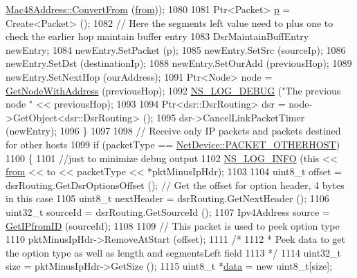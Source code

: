 \begin{DoxyCode}
      \hyperlink{classns3_1_1Mac48Address_a911ce13603a9ef837545a032b6523ae4}{Mac48Address::ConvertFrom} (\hyperlink{lte__amc_8m_a1b4c81ff74eb1a626b5ade44c81004b3}{from}));
1080 
1081       Ptr<Packet> \hyperlink{lte__link__budget_8m_ac9de518908a968428863f829398a4e62}{p} = Create<Packet> ();
1082       \textcolor{comment}{// Here the segments left value need to plus one to check the earlier hop maintain buffer entry}
1083       DsrMaintainBuffEntry newEntry;
1084       newEntry.SetPacket (p);
1085       newEntry.SetSrc (sourceIp);
1086       newEntry.SetDst (destinationIp);
1088       newEntry.SetOurAdd (previousHop);
1089       newEntry.SetNextHop (ourAddress);
1091       Ptr<Node> node = \hyperlink{classns3_1_1dsr_1_1DsrRouting_aa301f5bb9481fe5392297015328e6332}{GetNodeWithAddress} (previousHop);
1092       \hyperlink{group__logging_ga413f1886406d49f59a6a0a89b77b4d0a}{NS\_LOG\_DEBUG} (\textcolor{stringliteral}{"The previous node "} << previousHop);
1093 
1094       Ptr<dsr::DsrRouting> dsr = node->GetObject<dsr::DsrRouting> ();
1095       dsr->CancelLinkPacketTimer (newEntry);
1096     \}
1097 
1098   \textcolor{comment}{// Receive only IP packets and packets destined for other hosts}
1099   \textcolor{keywordflow}{if} (packetType == \hyperlink{classns3_1_1NetDevice_ace65153f09144f55a0d3e702fc29d6b2a60c00fab4286dd2903e2b197a9f8c6c8}{NetDevice::PACKET\_OTHERHOST})
1100     \{
1101       \textcolor{comment}{//just to minimize debug output}
1102       \hyperlink{group__logging_gafbd73ee2cf9f26b319f49086d8e860fb}{NS\_LOG\_INFO} (\textcolor{keyword}{this} << \hyperlink{lte__amc_8m_a1b4c81ff74eb1a626b5ade44c81004b3}{from} << to << packetType << *pktMinusIpHdr);
1103 
1104       uint8\_t offset = dsrRouting.GetDsrOptionsOffset ();        \textcolor{comment}{// Get the offset for option header, 4
       bytes in this case}
1105       uint8\_t nextHeader = dsrRouting.GetNextHeader ();
1106       uint32\_t sourceId = dsrRouting.GetSourceId ();
1107       Ipv4Address source = \hyperlink{classns3_1_1dsr_1_1DsrRouting_abaf6e655b3bf50d3002c3739409d23a6}{GetIPfromID} (sourceId);
1108 
1109       \textcolor{comment}{// This packet is used to peek option type}
1110       pktMinusIpHdr->RemoveAtStart (offset);
1111       \textcolor{comment}{/*}
1112 \textcolor{comment}{       * Peek data to get the option type as well as length and segmentsLeft field}
1113 \textcolor{comment}{       */}
1114       uint32\_t size = pktMinusIpHdr->GetSize ();
1115       uint8\_t *\hyperlink{topology-example-sim_8cc_a26c65296e316af77b787dc77469bb2a4}{data} = \textcolor{keyword}{new} uint8\_t[size];

\end{DoxyCode}
